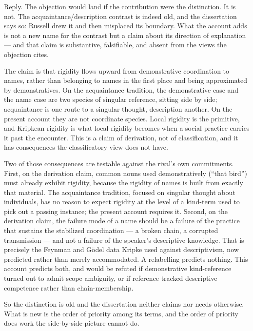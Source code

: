 \documentclass[12pt,a4paper]{article}
\begin{document}
Reply. The objection would land if the contribution were the distinction. It is not. The acquaintance/description contrast is indeed old, and the dissertation says so: Russell drew it and then misplaced its boundary. What the account adds is not a new name for the contrast but a claim about its direction of explanation --- and that claim is substantive, falsifiable, and absent from the views the objection cites.

The claim is that rigidity flows upward from demonstrative coordination to names, rather than belonging to names in the first place and being approximated by demonstratives. On the acquaintance tradition, the demonstrative case and the name case are two species of singular reference, sitting side by side; acquaintance is one route to a singular thought, description another. On the present account they are not coordinate species. Local rigidity is the primitive, and Kripkean rigidity is what local rigidity becomes when a social practice carries it past the encounter. This is a claim of derivation, not of classification, and it has consequences the classificatory view does not have.

Two of those consequences are testable against the rival's own commitments. First, on the derivation claim, common nouns used demonstratively (``that bird'') must already exhibit rigidity, because the rigidity of names is built from exactly that material. The acquaintance tradition, focused on singular thought about individuals, has no reason to expect rigidity at the level of a kind-term used to pick out a passing instance; the present account requires it. Second, on the derivation claim, the failure mode of a name should be a failure of the practice that sustains the stabilized coordination --- a broken chain, a corrupted transmission --- and not a failure of the speaker's descriptive knowledge. That is precisely the Feynman and Gödel data Kripke used against descriptivism, now predicted rather than merely accommodated. A relabelling predicts nothing. This account predicts both, and would be refuted if demonstrative kind-reference turned out to admit scope ambiguity, or if reference tracked descriptive competence rather than chain-membership.

So the distinction is old and the dissertation neither claims nor needs otherwise. What is new is the order of priority among its terms, and the order of priority does work the side-by-side picture cannot do.
\end{document}
